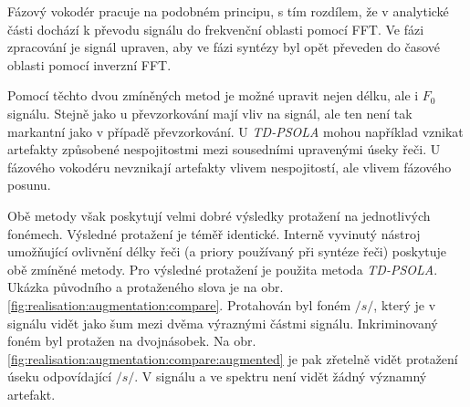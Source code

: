 Fázový vokodér pracuje na podobném principu, s tím rozdílem, že v analytické části dochází k převodu signálu do frekvenční oblasti pomocí FFT. Ve fázi zpracování je signál upraven, aby ve fázi syntézy byl opět převeden do časové oblasti pomocí inverzní FFT.

Pomocí těchto dvou zmíněných metod je možné upravit nejen délku, ale i $F_0$ signálu. Stejně jako u převzorkování mají vliv na signál, ale ten není tak markantní jako v případě převzorkování. U \textit{TD-PSOLA} mohou například vznikat artefakty způsobené nespojitostmi mezi sousedními upravenými úseky řeči. U fázového vokodéru nevznikají artefakty vlivem nespojitostí, ale vlivem fázového posunu.


Obě metody však poskytují velmi dobré výsledky protažení na jednotlivých fonémech. Výsledné protažení je téměř identické. Interně vyvinutý nástroj umožňující ovlivnění délky řeči (a priory používaný při syntéze řeči) poskytuje obě zmíněné metody. Pro výsledné protažení je použita metoda \textit{TD-PSOLA}. Ukázka původního a protaženého slova  je na obr. \ref{fig:realisation:augmentation:compare}. Protahován byl foném $/s/$, který je v signálu vidět jako šum mezi dvěma výraznými částmi signálu. Inkriminovaný foném byl protažen na dvojnásobek. Na obr. \ref{fig:realisation:augmentation:compare:augmented} je pak zřetelně vidět protažení úseku odpovídající $/s/$. V signálu a ve spektru není vidět žádný významný artefakt.

